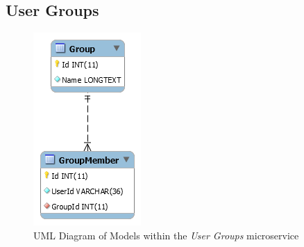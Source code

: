 \subsection{User Groups}
\begin{figure}[H]
    \centering
    \includegraphics[width=\textwidth]{Images/db_uml/user-groups.png}
    \caption{UML Diagram of Models within the \textit{User Groups} microservice}
    \label{fig:db_uml:user-groups}
\end{figure}